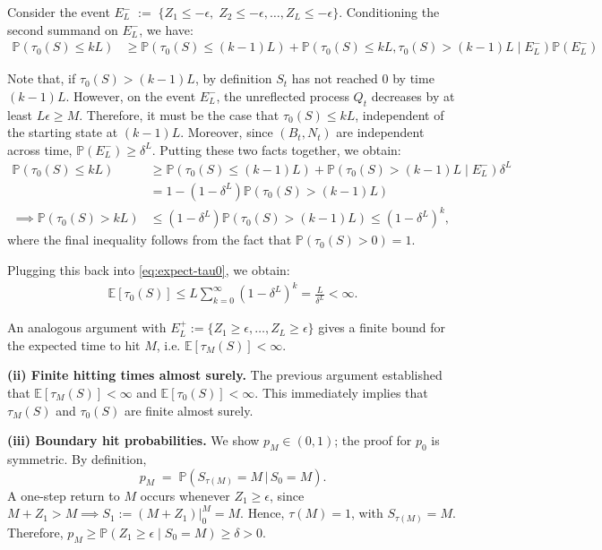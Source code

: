 \documentclass[mnsc,nonblindrev]{informs3}
\newcommand{\pr}{\mathbb{P}}
\renewcommand{\Pr}{\pr}
\newcommand{\Exp}[1]{\mathbb{E} \left[ #1 \right]} %
\renewenvironment{proof}[1][Proof]{%
  \par\noindent{\itshape #1.} \ignorespaces
}{%
  \hfill\Halmos\par
}
\begin{document}
\begin{APPENDICES}
\begin{proof}
Consider the event $
E^-_L \;:=\; \{Z_1\le -\epsilon,\; Z_2\le -\epsilon,\ldots, Z_L\le -\epsilon\}.$ Conditioning the second summand on $E_L^-$, we have:
\begin{align*}
\mathbb{P}\left(\tau_0(S) \leq kL\right) &\geq \mathbb{P}\left(\tau_0(S) \leq (k-1)L\right) + \mathbb{P}\left(\tau_0(S) \leq kL , \tau_0(S) > (k-1)L \mid E_L^-\right)\mathbb{P}(E_L^-)
\end{align*}

Note that, if $\tau_0(S) > (k-1)L$, by definition $S_t$ has not reached 0 by time $(k-1)L$. However, on the event $E_L^-$, the unreflected process $Q_t$ decreases by at least $L\epsilon \geq M$. Therefore, it must be the case that $\tau_0(S) \leq kL$, independent of the starting state at $(k-1)L$. Moreover, since $(B_t,N_t)$ are independent across time,
\(\Pr(E^-_L)\ge \delta^L\). Putting these two facts together, we obtain:
\begin{align*}
\mathbb{P}\left(\tau_0(S) \leq kL\right) &\geq \mathbb{P}\left(\tau_0(S) \leq (k-1)L\right) + \mathbb{P}\left( \tau_0(S) > (k-1)L \mid E_L^-\right)\delta^L\\
&= 1-(1-\delta^L)\mathbb{P}\left(\tau_0(S)>(k-1)L\right)
\\
\implies \mathbb{P}\left(\tau_0(S) > kL\right) &\leq (1-\delta^L)\mathbb{P}\left(\tau_0(S) > (k-1)L\right) \leq (1-\delta^L)^k,
\end{align*}
where the final inequality follows from the fact that $\mathbb{P}(\tau_0(S) > 0) = 1$.

Plugging this back into \eqref{eq:expect-tau0}, we obtain:
\begin{align*}
\mathbb{E}[\tau_0(S)] \leq L\sum_{k=0}^{\infty}(1-\delta^L)^k = \frac{L}{\delta^L} < \infty.
\end{align*}

An analogous argument with $E^+_L := \{Z_1\ge \epsilon,\ldots,Z_L\ge \epsilon\}$ gives a finite bound for the expected time to hit $M$, i.e. $\Exp{\tau_M(S)} < \infty$.


\medskip
\noindent\textbf{(ii) Finite hitting times almost surely.}
The previous argument established that $\Exp{\tau_M(S)} < \infty$ and $\Exp{\tau_0(S)} < \infty$. This immediately implies that $\tau_M(S)$ and $\tau_0(S)$ are finite almost surely.

\medskip
\noindent\textbf{(iii) Boundary hit probabilities.} We show $p_M\in(0,1)$; the proof for $p_0$ is symmetric.
By definition,
\[
p_M \;=\; \Pr(S_{\tau(M)}=M \,\big|\, S_0 = M).
\]
A one-step return to $M$ occurs whenever $Z_1\ge \epsilon$, since $M+Z_1 > M \implies S_1 := (M+Z_1)\vert_0^M=M$. Hence, $\tau(M) = 1$, with $S_{\tau(M)} = M$.
Therefore, $p_M \ge \Pr(Z_1\ge \epsilon\mid S_0=M)\ge \delta>0$.


\end{proof}
\end{APPENDICES}
\end{document}
